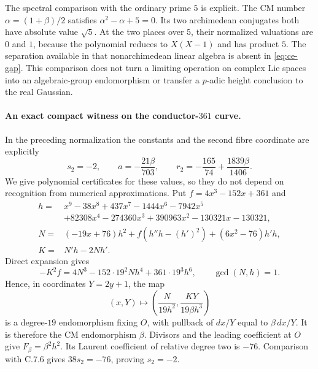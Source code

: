 The spectral comparison with the ordinary prime $5$ is
explicit. The CM number $\alpha=(1+\beta)/2$ satisfies
$\alpha^2-\alpha+5=0$. Its two archimedean conjugates
both have absolute value $\sqrt5$. At the two places over
$5$, their normalized valuations are $0$ and $1$, because
the polynomial reduces to $X(X-1)$ and has product $5$.
The separation available in that nonarchimedean linear
algebra is absent in \eqref{eq:ce-gap}. This comparison
does not turn a limiting operation on complex Lie spaces
into an algebraic-group endomorphism or transfer a
$p$-adic height conclusion to the real Gaussian.

\paragraph{An exact compact witness on the conductor-$361$ curve.}
In the preceding normalization the constants and the second
fibre coordinate are explicitly
\begin{equation}\label{eq:ce-explicit-witness}
 s_2=-2,\qquad a=-\frac{21\beta}{703},\qquad
 r_2=-\frac{165}{74}+\frac{1839\beta}{1406}.
\end{equation}
We give polynomial certificates for these values, so they
do not depend on recognition from numerical approximations.
Put $f=4x^3-152x+361$ and
\[
 \begin{aligned}
 h={}&x^9-38x^8+437x^7-1444x^6-7942x^5\\
     &+82308x^4-274360x^3+390963x^2-130321x-130321,\\
 N={}&(-19x+76)h^2+f(h''h-(h')^2)+(6x^2-76)h'h,\\
 K={}&N'h-2Nh'.
 \end{aligned}
\]
Direct expansion gives
\[
 -K^2f=4N^3-152\cdot19^2Nh^4+361\cdot19^3h^6,
 \qquad \gcd(N,h)=1.
\]
Hence, in coordinates $Y=2y+1$, the map
\[
 (x,Y)\longmapsto
 \left(\frac{N}{19h^2},\frac{KY}{19\beta h^3}\right)
\]
is a degree-$19$ endomorphism fixing $O$, with pullback of
$dx/Y$ equal to $\beta\,dx/Y$. It is therefore the CM
endomorphism $\beta$. Divisors and the leading coefficient
at $O$ give $F_\beta=\beta^2h^2$. Its Laurent coefficient
of relative degree two is $-76$. Comparison with C.7.6
gives $38s_2=-76$, proving $s_2=-2$.

